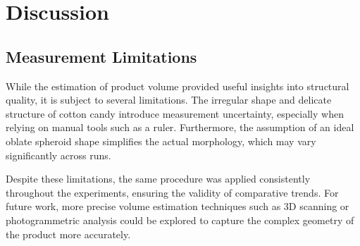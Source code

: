 \chapter{Discussion}
\label{sec:discussion}

\section{Measurement Limitations}

While the estimation of product volume provided useful insights into structural quality, it is subject to several limitations. The irregular shape and delicate structure of cotton candy introduce measurement uncertainty, especially when relying on manual tools such as a ruler. Furthermore, the assumption of an ideal oblate spheroid shape simplifies the actual morphology, which may vary significantly across runs.

Despite these limitations, the same procedure was applied consistently throughout the experiments, ensuring the validity of comparative trends. For future work, more precise volume estimation techniques such as 3D scanning or photogrammetric analysis could be explored to capture the complex geometry of the product more accurately.
